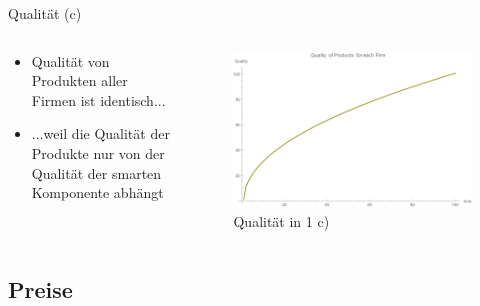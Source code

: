 \documentclass[xcolor={dvipsnames},10pt]{beamer}
\begin{document}
\begin{frame}{Qualität (c)}
\begin{columns}[T]
    \begin{column}{.3\textwidth}
      \begin{itemize}
      \item Qualität von Produkten aller Firmen ist identisch...
      \item ...weil die Qualität der Produkte nur von der Qualität der smarten Komponente abhängt
      \end{itemize}
      \end{column}
      \begin{column}{.7\textwidth}
      \begin{figure}[t]
            \centering
            \includegraphics[scale=0.35]{../Plots/quality1c}
            \caption{Qualität in 1 c)}
            \label{fig:quality1c}
       \end{figure}
    \end{column}
  \end{columns}
\end{frame}

\subsection{Preise}
\end{document}
